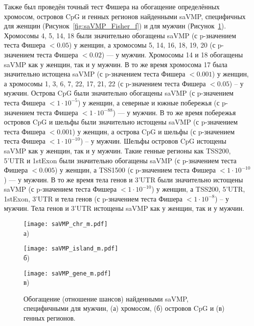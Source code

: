 Также был проведён точный тест Фишера \autocite{fisher2006statistical} на обогащение определённых хромосом, островов CpG и генных регионов найденными saVMP, специфичных для женщин (Рисунок~\ref{fig:saVMP_Fisher_f}) и для мужчин (Рисунок~\ref{fig:saVMP_Fisher_m}). Хромосомы 4, 5, 14, 18 были значительно обогащены saVMP (с p-значением теста Фишера $< 0.05$) у женщин, а хромосомы 5, 14, 16, 18, 19, 20 (с p-значением теста Фишера $< 0.02$) --- у мужчин. Хромосомы 14 и 18 обогащены saVMP как у женщин, так и у мужчин. В то же время хромосома 17 была значительно истощена saVMP (с p-значением теста Фишера $< 0.001$) у женщин, а хромосомы 1, 3, 6, 7, 22, 17, 21, 22 (с p-значением теста Фишера $< 0.05$) -- у мужчин. Острова CpG были значительно обогащены saVMP (с p-значением теста Фишера $< 1 \cdot 10^{-5}$) у женщин, а северные и южные побережья (с p-значением теста Фишера $< 1 \cdot 10^{-88}$) --- у мужчин. В то же время побережья островов CpG и шельфы были значительно истощены saVMP (с p-значением теста Фишера $< 0.001$) у женщин, а острова CpG и шельфы (с p-значением теста Фишера $< 1 \cdot 10^{-10}$) -- у мужчин. Шельфы островов CpG истощены saVMP как у женщин, так и у мужчин. Такие генные регионы как TSS200, 5'UTR и 1stExon были значительно обогащены saVMP (с p-значением теста Фишера $< 0.005$) у женщин, а TSS1500 (с p-значением теста Фишера $< 1 \cdot 10^{-10}$) --- у мужчин. В то же время тела генов и 3'UTR были значительно истощены saVMP (с p-значением теста Фишера $< 1 \cdot 10^{-10}$) у женщин, а TSS200, 5'UTR, 1stExon, 3'UTR и тела генов (с p-значением теста Фишера $< 1 \cdot 10^{-8}$) -- у мужчин. Тела генов и 3'UTR истощены saVMP как у женщин, так и у мужчин.

\begin{figure}[ht]
	\begin{minipage}[b][][b]{0.49\linewidth}\centering
		\texttt{[image: saVMP\_chr\_m.pdf]} \\ а)
	\end{minipage}
	\hfill
	\begin{minipage}[b][][b]{0.49\linewidth}\centering
		\texttt{[image: saVMP\_island\_m.pdf]} \\ б)
	\end{minipage}
	\begin{minipage}[b][][b]{0.99\linewidth}\centering
		\texttt{[image: saVMP\_gene\_m.pdf]} \\ в)
	\end{minipage}
	\caption{Обогащение (отношение шансов) найденными saVMP, специфичными для мужчин, (а) хромосом, (б) островов CpG и (в) генных регионов.}
	\label{fig:saVMP_Fisher_m}
\end{figure}

